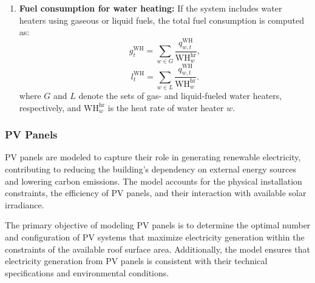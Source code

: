 \documentclass[11pt]{article}
\begin{document}
\begin{enumerate}
    \item \textbf{Fuel consumption for water heating:}
    If the system includes water heaters using gaseous or liquid fuels, the total fuel consumption is computed as:
    \[
    g^\text{WH}_{t} = \sum_{w \in G} \frac{q^\text{WH}_{w,t}}{\text{WH}^\text{hr}_w},
    \]
    \[
    l^\text{WH}_{t} = \sum_{w \in L} \frac{q^\text{WH}_{w,t}}{\text{WH}^\text{hr}_w}.
    \]
    where \(G\) and \(L\) denote the sets of gas- and liquid-fueled water heaters, respectively, and \(\text{WH}^\text{hr}_w\) is the heat rate of water heater \(w\).
\end{enumerate}

\subsubsection{PV Panels}
\label{sec:pv}

PV panels are modeled to capture their role in generating renewable electricity, contributing to reducing the building's dependency on external energy sources and lowering carbon emissions. The model accounts for the physical installation constraints, the efficiency of PV panels, and their interaction with available solar irradiance.

The primary objective of modeling PV panels is to determine the optimal number and configuration of PV systems that maximize electricity generation within the constraints of the available roof surface area. Additionally, the model ensures that electricity generation from PV panels is consistent with their technical specifications and environmental conditions.
\end{document}
